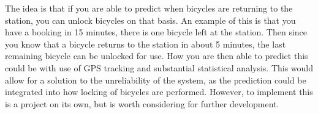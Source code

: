 \begin{description}[style=nextline]
		\item[Prediction]
		The idea is that if you are able to predict when bicycles are returning to the station, you can unlock bicycles on that basis.
		An example of this is that you have a booking in 15 minutes, there is one bicycle left at the station. Then since you know that a bicycle returns to the station in about 5 minutes, the last remaining bicycle can be unlocked for use.
		How you are then able to predict this could be with use of GPS tracking and substantial statistical analysis.
		This would allow for a solution to the unreliability of the system, as the prediction could be integrated into how locking of bicycles are performed.
		However, to implement this is a project on its own, but is worth considering for further development.
\end{description}

